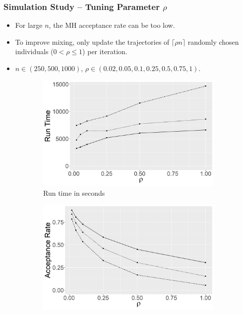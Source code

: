 \documentclass{beamer}
\begin{document}
\begin{frame} \frametitle{Simulation Study --  Tuning Parameter $\rho$}  
	\begin{itemize}
		\item For large $n$, the MH acceptance rate can be too low.
		\item To improve mixing, only update the trajectories of $\lceil\rho n\rceil$ randomly chosen individuals ($0<\rho\le1$) per iteration.
		\item $n\in(250, 500, 1000)$, $\rho \in (0.02, 0.05, 0.1, 0.25, 0.5, 0.75, 1)$.
	\end{itemize} 
	
\begin{figure}
	\centering
	\begin{subfigure}[b]{0.32\textwidth}
		\centering
		\includegraphics[width=\textwidth]{E3_runtime}
		\caption{Run time in seconds}
		\label{fig:E3_runtime}
	\end{subfigure}
	\hfill
	\begin{subfigure}[b]{0.32\textwidth}
		\centering
		\includegraphics[width=\textwidth]{E3_accept}

\end{subfigure}
\end{figure}
\end{frame}
\end{document}
